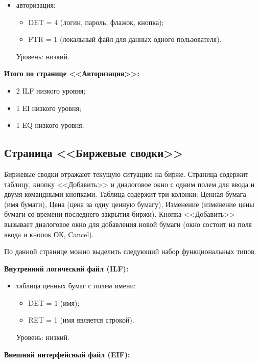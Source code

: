\begin{itemize}
    \item авторизация:
    \begin{itemize}
        \item DET = 4 (логин, пароль, флажок, кнопка);
        \item FTR = 1 (локальный файл для данных одного пользователя).
    \end{itemize}
    Уровень: низкий.
\end{itemize}

\textbf{Итого по странице <<Авторизация>>:}

\begin{itemize}
    \item 2 ILF низкого уровня;
    \item 1 EI низкого уровня;
    \item 1 EQ низкого уровня.
\end{itemize}


\subsection{Страница <<Биржевые сводки>>}


Биржевые сводки отражают текущую ситуацию на бирже. Страница содержит таблицу, кнопку <<Добавить>> и диалоговое окно с одним полем для ввода и двумя командными кнопками. Таблица содержит три колонки: Ценная бумага (имя бумаги), Цена (цена за одну ценную бумагу), Изменение (изменение цены бумаги со времени последнего закрытия биржи). Кнопка <<Добавить>> вызывает диалоговое окно для добавления новой бумаги (окно состоит из поля ввода и кнопок ОК, Cancel).

По данной странице можно выделить следующий набор функциональных типов.


\textbf{Внутренний логический файл (ILF):}

\begin{itemize}
    \item таблица ценных бумаг с полем имени:
    \begin{itemize}
        \item DET = 1 (имя);
        \item RET = 1 (имя является строкой).
    \end{itemize}
    Уровень: низкий.
\end{itemize}

\textbf{Внешний интерфейсный файл (EIF):}

